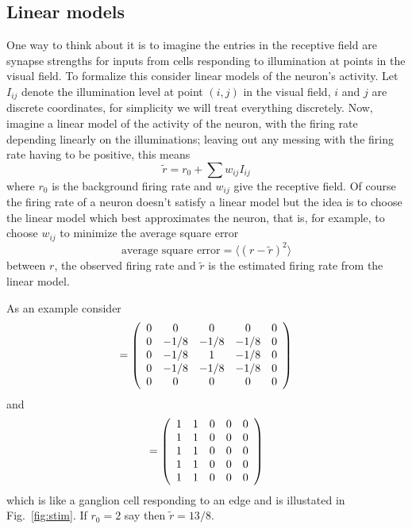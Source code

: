 \documentclass[11pt,a4paper]{scrartcl}
\begin{document}
\subsection*{Linear models}


One way to think about it is to imagine the entries in the receptive
field are synapse strengths for inputs from cells responding to
illumination at points in the visual field. To formalize this consider
linear models of the neuron's activity. Let $I_{ij}$ denote the
illumination level at point $(i,j)$ in the visual field, $i$ and $j$
are discrete coordinates, for simplicity we will treat everything
discretely. Now, imagine a linear model of the activity of the neuron,
with the firing rate depending linearly on the illuminations; leaving
out any messing with the firing rate having to be positive, this means
\begin{equation}
\tilde{r}=r_0+\sum w_{ij}I_{ij}
\end{equation}
where $r_0$ is the background firing rate and $w_{ij}$ give the
receptive field. Of course the firing rate of a neuron doesn't satisfy
a linear model but the idea is to choose the linear model which best
approximates the neuron, that is, for example, to choose $w_{ij}$ to
minimize the average square error 
\begin{equation}
\mbox{average square error}=\langle (r-\tilde{r})^2\rangle
\end{equation}
between $r$, the observed firing rate and $\tilde{r}$ is the estimated
firing rate from the linear model.

As an example consider
\begin{equation}
[w_{ij}]=\left(\begin{array}{ccccc}
0&0&0&0&0\cr
0&-1/8&-1/8&-1/8&0\cr
0&-1/8&1&-1/8&0\cr
0&-1/8&-1/8&-1/8&0\cr
0&0&0&0&0\end{array}
\right)
\end{equation}
and
\begin{equation}
[I_{ij}]=\left(\begin{array}{ccccc}
1&1&0&0&0\cr
1&1&0&0&0\cr
1&1&0&0&0\cr
1&1&0&0&0\cr
1&1&0&0&0\end{array}
\right)
\end{equation}
which is like a ganglion cell responding to an edge and is illustated
in Fig.~\ref{fig:stim}. If $r_0=2$ say then $\tilde{r}=13/8$.
\end{document}
